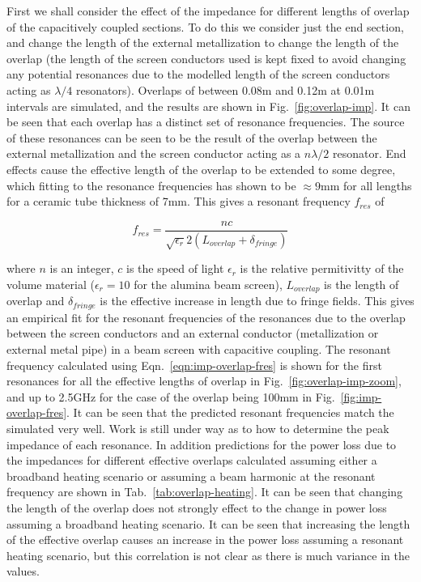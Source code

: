 First we shall consider the effect of the impedance for different lengths of overlap of the capacitively coupled sections. To do this we consider just the end section, and change the length of the external metallization to change the length of the overlap (the length of the screen conductors used is kept fixed to avoid changing any potential resonances due to the modelled length of the screen conductors acting as $\lambda /4$ resonators). Overlaps of between 0.08m and 0.12m at 0.01m intervals are simulated, and the results are shown in Fig.~\ref{fig:overlap-imp}. It can be seen that each overlap has a distinct set of resonance frequencies. The source of these resonances can be seen to be the result of the overlap between the external metallization and the screen conductor acting as a $n \lambda /2$ resonator. End effects cause the effective length of the overlap to be extended to some degree, which fitting to the resonance frequencies has shown to be $\approx 9$mm for all lengths for a ceramic tube thickness of 7mm. This gives a resonant frequency $f_{res}$ of

\begin{equation}
f_{res} = \frac{nc}{\sqrt{\epsilon_{r}}2 \left( L_{overlap} + \delta_{fringe} \right)}
\label{eqn:imp-overlap-fres}
\end{equation}

where $n$ is an integer, $c$ is the speed of light $\epsilon_{r}$ is the relative permitivitty of the volume material ($\epsilon_{r}=10$ for the alumina beam screen), $L_{overlap}$ is the length of overlap and $\delta_{fringe}$ is the effective increase in length due to fringe fields. This gives an empirical fit for the resonant frequencies of the resonances due to the overlap between the screen conductors and an external conductor (metallization or external metal pipe) in a beam screen with capacitive coupling. The resonant frequency calculated using Eqn.~\ref{eqn:imp-overlap-fres} is shown for the first resonances for all the effective lengths of overlap in Fig.~\ref{fig:overlap-imp-zoom}, and up to 2.5GHz for the case of the overlap being 100mm in Fig.~\ref{fig:imp-overlap-fres}. It can be seen that the predicted resonant frequencies match the simulated very well. Work is still under way as to how to determine the peak impedance of each resonance. In addition predictions for the power loss due to the impedances for different effective overlaps calculated assuming either a broadband heating scenario or assuming a beam harmonic at the resonant frequency are shown in Tab.~\ref{tab:overlap-heating}. It can be seen that changing the length of the overlap does not strongly effect to the change in power loss assuming a broadband heating scenario. It can be seen that increasing the length of the effective overlap causes an increase in the power loss assuming a resonant heating scenario, but this correlation is not clear as there is much variance in the values.

